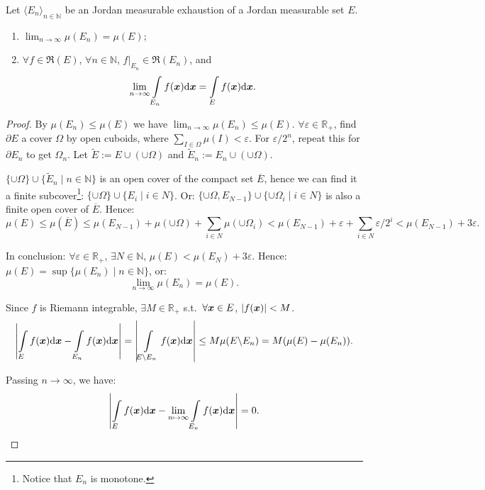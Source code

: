 \documentclass[openany]{book}
\begin{document}
\begin{theorem}
	\label{theorem: measure of limit of sets}
	Let $\langle E_n \rangle_{n \in \mathbb N}$ be an Jordan measurable exhaustion of a Jordan measurable set $E$.
	\begin{enumerate}
		\item $\lim_{n \to \infty} \mu(E_n) = \mu(E)$;
		\item $\forall f \in \mathfrak R(E)$, $\forall n \in \mathbb N$, $f|_{E_n} \in \mathfrak R(E_n)$, and
		\begin{equation*}
			\lim_{n \to \infty} \int\limits_{E_n} f(\boldsymbol{x}) \mathrm{d} \boldsymbol{x} = \int\limits_E f(\boldsymbol{x}) \mathrm{d} \boldsymbol{x}.
		\end{equation*}
	\end{enumerate}
\end{theorem}
\begin{proof}
	By $\mu(E_n) \leq \mu(E)$ we have $\lim_{n \to \infty} \mu(E_n) \leq \mu(E)$.
	$\forall \varepsilon \in \mathbb R_+$, find $\partial E$ a cover $\varOmega$ by open cuboids, where $\sum_{I \in \varOmega} \mu(I) < \varepsilon$. 
	For $\varepsilon / 2^n$, repeat this for $\partial E_n$ to get $\varOmega_n$.
	Let $\tilde E := E \cup (\cup \varOmega)$ and $\tilde E_n := E_n \cup (\cup \varOmega)$.

	$\{\cup \varOmega\} \cup \{\tilde E_n \mid n \in \mathbb N\}$ is an open cover of the compact set $\overline E$, hence we can find it a finite subcover\footnote{Notice that $E_n$ is monotone.}: $\{\cup \varOmega\} \cup \{E_{i} \mid i \in N\}$. 
	Or: $\{\cup \varOmega, E_{N-1}\} \cup \{\cup \varOmega_i \mid i \in N\}$ is also a finite open cover of $\overline E$. 
	Hence:
	\begin{equation*}
		\mu(E) \leq \mu(\overline E) 
		\leq \mu(E_{N-1}) + \mu(\cup \varOmega) + \sum_{i \in N} \mu(\cup \varOmega_i)
		< \mu(E_{N-1}) + \varepsilon + \sum_{i \in N} \varepsilon/2^i 
		< \mu(E_{N-1}) + 3\varepsilon.
	\end{equation*}

	In conclusion: $\forall \varepsilon \in \mathbb R_+$, $\exists N \in \mathbb N$, $\mu(E) < \mu(E_N) + 3 \varepsilon$. Hence: $\mu(E) = \sup \{\mu(E_n) \mid n \in \mathbb N\}$, or:
	\begin{equation*}
		\lim_{n \to \infty} \mu(E_n) = \mu(E).
	\end{equation*}

	Since $f$ is Riemann integrable, $\exists M \in \mathbb R_+$ s.t.\ $\forall \boldsymbol{x} \in E$, $|f(\boldsymbol{x})| < M$.
	\begin{equation*}
		\left|
			\int\limits_E f(\boldsymbol{x}) \mathrm{d} \boldsymbol{x} - \int\limits_{E_n} f(\boldsymbol{x}) \mathrm{d} \boldsymbol{x}
		\right| 
		= \left|
			\int\limits_{E \backslash E_n} f(\boldsymbol{x}) \mathrm{d} \boldsymbol{x} 
		\right|
		\leq M \mu(E \backslash E_n) = M (\mu(E) - \mu(E_n)).
	\end{equation*}

	Passing $n \to \infty$, we have: 
	\begin{equation*}
		\left|
			\int\limits_E f(\boldsymbol{x}) \mathrm{d} \boldsymbol{x} - \lim_{n \mapsto \infty}\int\limits_{E_n} f(\boldsymbol{x}) \mathrm{d} \boldsymbol{x}
		\right| = 0.
	\end{equation*}
\end{proof}
\end{document}
